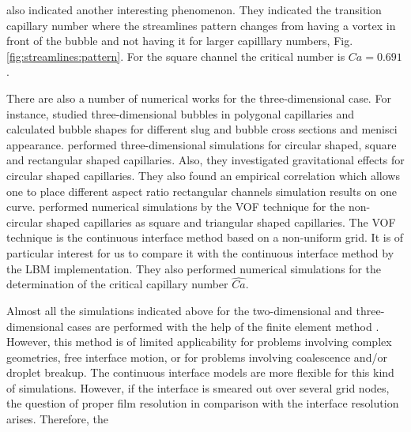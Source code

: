 \documentclass{CFD2011}
\begin{document}
\begin{description}
\citet{heil-threedim} also indicated another interesting phenomenon. They indicated the transition
capillary number where the streamlines pattern
changes from having a vortex in front of the bubble and not having it for larger capilllary
numbers,
Fig. \ref{fig:streamlines:pattern}.
For the square channel the critical number is $Ca=0.691$.   

There are also a number of numerical works for the three-dimensional case. For instance, 
\citet{wong-films,wong-pressure} studied
three-dimensional bubbles in
polygonal capillaries and calculated bubble shapes for different
slug and bubble cross sections and menisci appearance.
\citet{heil-threedim} performed three-dimensional simulations for circular shaped,
square and rectangular shaped capillaries. Also, they investigated gravitational effects for
circular shaped capillaries. They also found an empirical correlation which allows one to place
different  aspect ratio rectangular channels simulation results on one
curve. \citet{wang-non-circular} performed numerical simulations by the VOF technique for the
non-circular
shaped capillaries as square and triangular shaped capillaries. The VOF technique is the continuous
interface method based on a non-uniform grid. It is of particular interest for us to compare it
with the continuous interface method by the LBM implementation. 
They also performed
numerical simulations for the determination of the critical capillary number $\widehat{Ca}$.
\end{description}
Almost all the simulations indicated above for the two-dimensional and three-dimensional cases
are performed with the help of the finite element method
\cite{ingham-plates,heil-bretherton,heil-threedim}. However, this method is of limited
applicability for
problems
involving complex geometries, free interface motion, or for problems involving coalescence and/or
droplet breakup. The continuous interface models are more flexible for this kind of simulations.
However, if the interface is smeared out over several grid nodes, the question of
proper film resolution in comparison with the interface resolution arises.  Therefore, the
\end{document}
